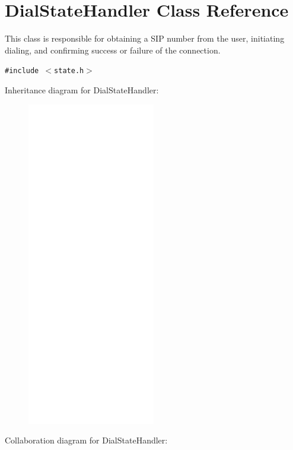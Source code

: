 \hypertarget{classDialStateHandler}{
\section{DialStateHandler Class Reference}
\label{classDialStateHandler}
}
This class is responsible for obtaining a SIP number from the user, initiating dialing, and confirming success or failure of the connection.  


{\tt \#include $<$state.h$>$}

Inheritance diagram for DialStateHandler:\nopagebreak
\begin{figure}[H]
\begin{center}
\leavevmode
\includegraphics[width=158pt]{classDialStateHandler__inherit__graph}
\end{center}
\end{figure}
Collaboration diagram for DialStateHandler:\nopagebreak
